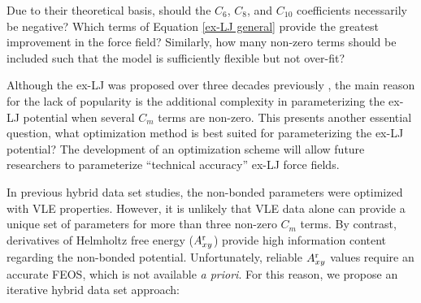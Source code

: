 \documentclass[11pt,a4paper]{article}
\begin{document}
%

Due to their theoretical basis, should the $C_6$, $C_8$, and $C_{10}$ coefficients necessarily be negative? Which terms of Equation \ref{ex-LJ general} provide the greatest improvement in the force field? Similarly, how many non-zero terms should be included such that the model is sufficiently flexible but not over-fit?  




Although the ex-LJ was proposed over three decades previously \cite{Kalos1972}, the main reason for the lack of popularity is the additional complexity in parameterizing the ex-LJ potential when several $C_m$ terms are non-zero. This presents another essential question, what optimization method is best suited for parameterizing the ex-LJ potential? The development of an optimization scheme will allow future researchers to parameterize ``technical accuracy'' ex-LJ force fields.

In previous hybrid data set studies, the non-bonded parameters were optimized with VLE properties. However, it is unlikely that VLE data alone can provide a unique set of parameters for more than three non-zero $C_m$ terms. By contrast, derivatives of Helmholtz free energy ($A_{xy}^{\rm r}$) provide high information content regarding the non-bonded potential. Unfortunately, reliable $A_{xy}^{\rm r}$ values require an accurate FEOS, which is not available \textit{a priori}. For this reason, we propose an iterative hybrid data set approach:

\end{document}
